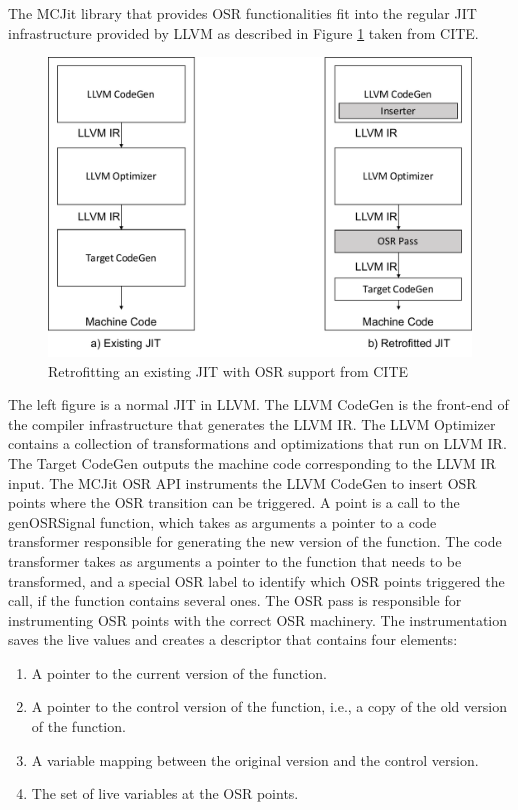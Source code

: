 The MCJit library that provides OSR functionalities fit into the regular JIT infrastructure provided by LLVM as described in Figure \ref{MCJitArchitecture} taken from CITE. 
\begin{figure}[h]
\centering
\includegraphics[scale=0.5]{Figures/MCJitArchitecture}
\decoRule
\caption[Retrofitting an existing JIT with OSR support]{Retrofitting an existing JIT with OSR support from CITE}
\label{MCJitArchitecture}
\end{figure}
The left figure is a normal JIT in LLVM. 
The LLVM CodeGen is the front-end of the compiler infrastructure that generates the LLVM IR.
The LLVM Optimizer contains a collection of transformations and optimizations that run on LLVM IR. 
The Target CodeGen outputs the machine code corresponding to the LLVM IR input. 
The MCJit OSR API instruments the LLVM CodeGen to insert OSR points where the OSR transition can be triggered. 
A point is a call to the genOSRSignal function, which takes as arguments a pointer to a code transformer responsible for generating the new version of the function.
The code transformer takes as arguments a pointer to the function that needs to be transformed, and a special OSR label to identify which OSR points triggered the call, if the function contains several ones.
The OSR pass is responsible for instrumenting OSR points with the correct OSR machinery.
The instrumentation saves the live values and creates a descriptor that contains four elements: 
\begin{enumerate}
    \item A pointer to the current version of the function. 
    \item A pointer to the control version of the function, i.e., a copy of the old version of the function.
    \item A variable mapping between the original version and the control version.
    \item The set of live variables at the OSR points. 
\end{enumerate}\\

